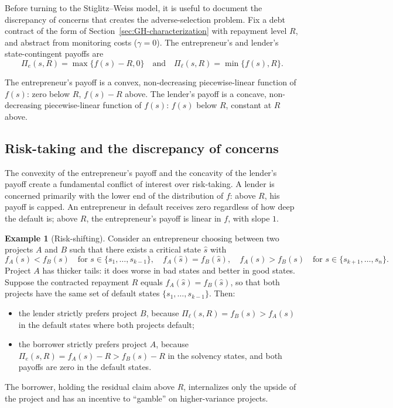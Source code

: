 \documentclass[11pt,a4paper,oneside]{book}
\def\et{\quad \text{and} \quad}
\theoremstyle{plain}
\theoremstyle{definition}
\newtheorem{example}[theorem]{Example}
\theoremstyle{remark}
\numberwithin{equation}{chapter}
\begin{document}
Before turning to the Stiglitz--Weiss model, it is useful to document the discrepancy of concerns that creates the adverse-selection problem.
Fix a debt contract of the form of Section~\ref{sec:GH-characterization} with repayment level $R$, and abstract from monitoring costs ($\gamma = 0$).
The entrepreneur's and lender's state-contingent payoffs are
\begin{equation}\label{eq:piecewise-payoffs}
  \Pi_e(s, R) = \max\{ f(s) - R, 0 \}
  \et
  \Pi_\ell(s, R) = \min\{ f(s), R \}.
\end{equation}

The entrepreneur's payoff is a convex, non-decreasing piecewise-linear function of $f(s)$: zero below $R$, $f(s) - R$ above.
The lender's payoff is a concave, non-decreasing piecewise-linear function of $f(s)$: $f(s)$ below $R$, constant at $R$ above.

\subsection{Risk-taking and the discrepancy of concerns}

The convexity of the entrepreneur's payoff and the concavity of the lender's payoff create a fundamental conflict of interest over risk-taking.
A lender is concerned primarily with the lower end of the distribution of $f$: above $R$, his payoff is capped.
An entrepreneur in default receives zero regardless of how deep the default is; above $R$, the entrepreneur's payoff is linear in $f$, with slope $1$.

\begin{example}[Risk-shifting]\label{ex:risk-shifting}
Consider an entrepreneur choosing between two projects $A$ and $B$ such that there exists a critical state $\widehat{s}$ with
\begin{equation*}
  f_A(s) < f_B(s) \quad \text{for } s \in \{s_1, \ldots, s_{k-1}\},
  \quad
  f_A(\widehat{s}) = f_B(\widehat{s}),
  \quad
  f_A(s) > f_B(s) \quad \text{for } s \in \{s_{k+1}, \ldots, s_n\}.
\end{equation*}
Project $A$ has thicker tails: it does worse in bad states and better in good states.
Suppose the contracted repayment $R$ equals $f_A(\widehat{s}) = f_B(\widehat{s})$, so that both projects have the same set of default states $\{s_1, \ldots, s_{k-1}\}$.
Then:
\begin{itemize}
  \item the lender strictly prefers project $B$, because $\Pi_\ell(s, R) = f_B(s) > f_A(s)$ in the default states where both projects default;
  \item the borrower strictly prefers project $A$, because $\Pi_e(s, R) = f_A(s) - R > f_B(s) - R$ in the solvency states, and both payoffs are zero in the default states.
\end{itemize}
The borrower, holding the residual claim above $R$, internalizes only the upside of the project and has an incentive to ``gamble'' on higher-variance projects.
\end{example}
\end{document}
